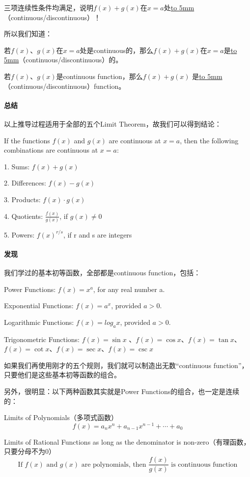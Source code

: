 \documentclass[UTF8]{ctexart}
\begin{document}
三项连续性条件均满足，说明$f(x) + g(x)$在$x = a$处\underline{\hbox to 5mm{}}（continuous/discontinuous）！

所以我们知道：

若$f(x)$、$g(x)$在$x = a$处是continuous的，那么$f(x)+g(x)$在$x=a$是\underline{\hbox to 5mm{}}（continuous/discontinuous）的。

若$f(x)$、$g(x)$是continuous function，那么$f(x) + g(x)$ 是\underline{\hbox to 5mm{}}（continuous/discontinuous）function。

\paragraph{总结}
以上推导过程适用于全部的五个Limit Theorem，故我们可以得到结论：

If the functions $f(x)$ and $g(x)$ are continuous at $x = a$, then the following combinations are continuous at $x = a$:

1. Sums: $f(x) + g(x)$

2. Differences: $f(x) - g(x)$

3. Products: $f(x) \cdot g(x)$

4. Quotients: $\frac{f(x)}{g(x)}$, if $g(x) \neq 0$

5. Powers: $f(x)^{r/s}$, if r and s are integers

\paragraph{发现}
我们学过的基本初等函数，全部都是continuous function，包括：

Power Functions: $f(x) = x^a$, for any real number a.

Exponential Functions: $f(x) = a^x$, provided $a>0$.

Logarithmic Functions: $f(x) = log_a x$, provided $a>0$.

Trigonometric Functions: $f(x) = \sin{x}$ 、$f(x) = \cos{x}$、$f(x) = \tan{x}$、$f(x) = \cot{x}$、$f(x) = \sec{x}$、$f(x) = \csc{x}$

如果我们再使用刚才的五个规则，我们就可以制造出无数“continuous function”，只要他们是这些基本初等函数的组合。

另外，很明显：以下两种函数其实就是Power Functions的组合，也一定是连续的：

Limits of Polynomials（多项式函数）
\[f(x) = a_nx^n + a_{n-1}x^{n-1}+\cdots+a_0\]

Limits of Rational Functions as long as the denominator is non-zero（有理函数，只要分母不为0）
\[\text{If } f(x) \text{ and } g(x) \text{ are polynomials, then $\frac{f(x)}{g(x)}$ is continuous function}\]
\end{document}
